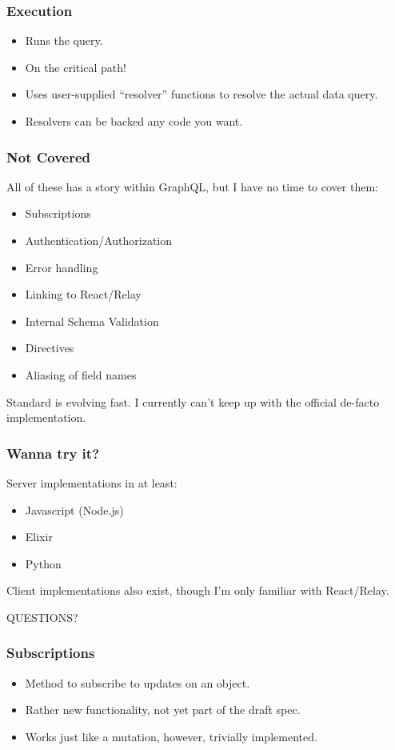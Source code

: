 \documentclass[lualatex]{beamer}
\begin{document}
\begin{frame}
  \frametitle{Execution}
  \begin{itemize}
  \item Runs the query.
  \item On the critical path!
  \item Uses user-supplied ``resolver'' functions to resolve the
    actual data query.
  \item Resolvers can be backed any code you want.
  \end{itemize}
\end{frame}

\begin{frame}
  \frametitle{Not Covered}
  All of these has a story within GraphQL, but I have no time to cover
  them:
  \begin{itemize}
  \item Subscriptions
  \item Authentication/Authorization
  \item Error handling
  \item Linking to React/Relay
  \item Internal Schema Validation
  \item Directives
  \item Aliasing of field names
  \end{itemize}
  Standard is evolving fast. I currently can't keep up with the
  official de-facto implementation.
\end{frame}

\begin{frame}
  \frametitle{Wanna try it?}
  Server implementations in at least:
  \begin{itemize}
  \item Javascript (Node.js)
  \item Elixir
  \item Python
  \end{itemize}
  Client implementations also exist, though I'm only familiar with
  React/Relay.
\end{frame}
\begin{frame}
  QUESTIONS?
\end{frame}

\begin{frame}
  \frametitle{Subscriptions}
  \begin{itemize}
  \item Method to subscribe to updates on an object.
  \item Rather new functionality, not yet part of the draft spec.
  \item Works just like a mutation, however, trivially implemented.
  \end{itemize}
\end{frame}
\end{document}
